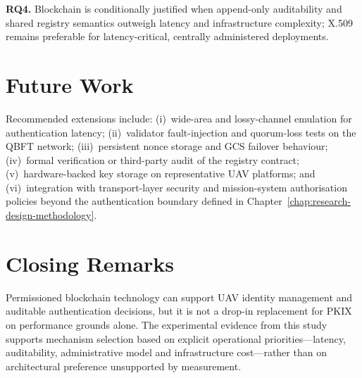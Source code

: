 \textbf{RQ4.} Blockchain is conditionally justified when append-only auditability and shared registry semantics outweigh latency and infrastructure complexity; X.509 remains preferable for latency-critical, centrally administered deployments.

\section{Future Work}
\label{sec:conclusion-future}

Recommended extensions include: (i)~wide-area and lossy-channel emulation for authentication latency; (ii)~validator fault-injection and quorum-loss tests on the QBFT network; (iii)~persistent nonce storage and GCS failover behaviour; (iv)~formal verification or third-party audit of the registry contract; (v)~hardware-backed key storage on representative UAV platforms; and (vi)~integration with transport-layer security and mission-system authorisation policies beyond the authentication boundary defined in Chapter~\ref{chap:research-design-methodology}.

\section{Closing Remarks}
\label{sec:conclusion-closing}

Permissioned blockchain technology can support UAV identity management and auditable authentication decisions, but it is not a drop-in replacement for PKIX on performance grounds alone. The experimental evidence from this study supports mechanism selection based on explicit operational priorities---latency, auditability, administrative model and infrastructure cost---rather than on architectural preference unsupported by measurement.
